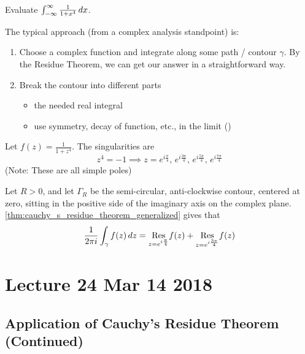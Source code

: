 \documentclass[notoc,notitlepage]{tufte-book}
\begin{document}
\begin{ex}
  Evaluate $\int_{-\infty}^{\infty} \frac{1}{1 + x^4} \dif{x}$.

  The typical approach (from a complex analysis standpoint) is:
  \begin{enumerate}
    \item Choose a complex function and integrate along some path / contour $\gamma$. By the Residue Theorem, we can get our answer in a straightforward way.
    \item Break the contour into different parts
    \begin{itemize}
      \item the needed real integral
      \item use symmetry, decay of function, etc., in the limit ()
    \end{itemize}
  \end{enumerate}

  Let $f(z) = \frac{1}{1 + z^4}$. The singularities are
  \begin{equation*}
    z^4 = -1 \implies z = e^{i \frac{\pi}{4}}, \, e^{i \frac{3 \pi}{4}}, \, e^{i \frac{5 \pi}{4} }, \, e^{i \frac{7 \pi}{4} }
  \end{equation*}
  (Note: These are all simple poles)

  Let $R > 0$, and let $\Gamma_R$ be the semi-circular, anti-clockwise contour, centered at zero, sitting in the positive side of the imaginary axis on the complex plane. \cref{thm:cauchy_s_residue_theorem_generalized} gives that
  \begin{equation*}
    \frac{1}{2 \pi i} \int_{\gamma} f(z) \dif{z} = \res{f(z)}{z = e^{i \frac{\pi}{4} }} + \res{f(z)}{z = e^{i \frac{3 \pi}{4} }}
  \end{equation*}
\end{ex}



\chapter{Lecture 24 Mar 14 2018}
  \label{chapter:lecture_24_mar_14_2018}

\section{Application of Cauchy's Residue Theorem (Continued)} %
\label{sec:application_of_cauchy_s_residue_theorem_continued}
\end{document}
